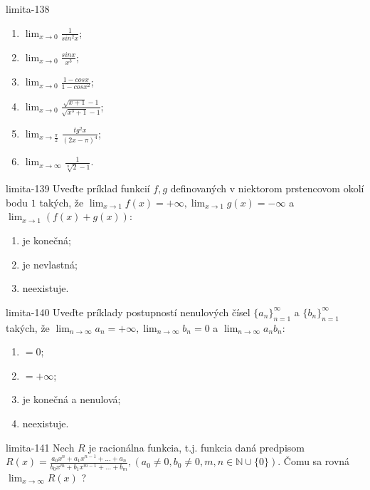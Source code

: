 \begin{defproblem}{limita-138}
\begin{multicols}{2}
\begin{enumerate}
    \item $\lim_{{x \rightarrow 0}} \frac{1}{sin ^2 x}$;
    \item $\lim_{{x \rightarrow 0}} \frac{sin x}{x^3}$;
    \item $\lim_{{x \rightarrow 0}} \frac{1-cos x}{1-cos x^2}$;
    \item $\lim_{{x \rightarrow 0}} \frac{\sqrt{x+1}-1}{\sqrt{x^3+1}-1}$;
    \item $\lim_{{x \rightarrow \frac{\pi}{2}}} \frac{tg ^2 x}{(2x-\pi)^4}$;
    \item $\lim_{{x \rightarrow \infty}} \frac{1}{\sqrt[n]{2}-1}$.
\end{enumerate}
\end{multicols}
\end{defproblem}

\begin{defproblem}{limita-139}
Uveďte príklad funkcií $f,g$ definovaných v niektorom prstencovom okolí bodu $1$ takých, že $\lim_{x \rightarrow 1} f(x)=+\infty,\lim_{x \rightarrow 1} g(x)=-\infty$ a $\lim_{x \rightarrow 1} (f(x)+g(x))$:
\begin{enumerate}
\item je konečná;
\item je nevlastná;
\item neexistuje.
\end{enumerate}
\end{defproblem}

\begin{defproblem}{limita-140}
Uveďte príklady postupností nenulových čísel ${\{a_n\}}_{n=1}^\infty$ a ${\{b_n\}}_{n=1}^\infty$ takých, že $\lim_{n \rightarrow \infty} a_n=+\infty,\lim_{n \rightarrow \infty} b_n=0$ a $\lim_{n \rightarrow \infty} a_nb_n$:
\begin{enumerate}
\item $=0$;
\item $=+\infty$;
\item je konečná a nenulová;
\item neexistuje.
\end{enumerate}
\end{defproblem}

\begin{defproblem}{limita-141}
Nech $R$ je racionálna funkcia, t.j. funkcia daná predpisom $R(x)=\frac{a_0x^n+a_1x^{n-1}+...+a_n}{b_0x^m+b_1x^{m-1}+...+b_m},(a_0 \neq 0, b_0 \neq 0,m,n \in \mathbb{N} \cup \{ 0\})$. Čomu sa rovná $\lim_{x \rightarrow \infty} R(x)$ ?
\end{defproblem}

